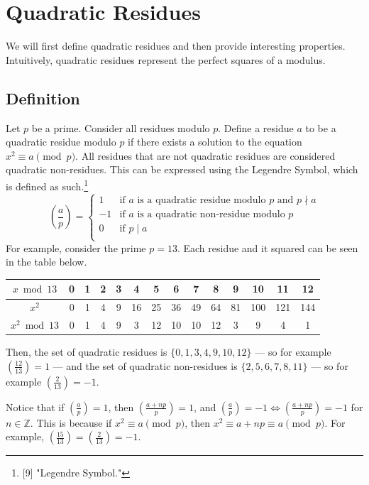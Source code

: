 \documentclass{article}
\newcommand{\Z}{\mathbb{Z}}
\newcommand{\qrn}[2]{\left( \frac{#1}{#2}\right)}
\begin{document}
\section{Quadratic Residues}
We will first define quadratic residues and then provide interesting properties. Intuitively, quadratic residues represent the perfect squares of a modulus.
\subsection{Definition}
Let $p$ be a prime. Consider all residues modulo $p$. Define a residue $a$ to be a quadratic residue modulo $p$ if there exists a solution to the equation $x^2 \equiv a \pmod p$. All residues that are not quadratic residues are considered quadratic non-residues. This can be expressed using the Legendre Symbol, which is defined as such.\footnote{[9] "Legendre Symbol."}
\[   \left( \frac{a}{p} \right) = \left\{
\begin{array}{ll}
      1 & \text{if }a \text{ is a quadratic residue modulo }p \text{ and } p \nmid a \\
      -1 & \text{if }a \text{ is a quadratic non-residue modulo }p\\
      0 & \text{if }p \mid a \\
\end{array} 
\right. \]
For example, consider the prime $p=13$. Each residue and it squared can be seen in the table below.
\begin{table}[H]
\centering
\begin{tabular}{|c|c|c|c|c|c|c|c|c|c|c|c|c|c|}
\hline
$x \bmod {13}$      & 0 & 1 & 2 & 3 & 4 & 5  & 6  & 7  & 8  & 9 & 10 & 11 & 12 \\ \hline
$x^2$ & 0 & 1 & 4 & 9 & 16 & 25 & 36 & 49 & 64 & 81 & 100  & 121  & 144  \\ \hline
$x^2\bmod {13}$ & 0 & 1 & 4 & 9 & 3 & 12 & 10 & 10 & 12 & 3 & 9  & 4  & 1  \\ \hline
\end{tabular}
\end{table}
Then, the set of quadratic residues is $\{0, 1, 3, 4, 9, 10, 12\}$ --- so for example $\qrn{12}{13}=1$ --- and the set of quadratic non-residues is $\{2, 5, 6, 7, 8, 11\}$ --- so for example $\qrn{2}{13}=-1$.

Notice that if $\qrn{a}{p} = 1$, then $\qrn{a+np}{p} = 1$, and $\qrn{a}{p} = -1 \iff \qrn{a+np}{p} = -1$ for $n \in \Z$. This is because if $x^2 \equiv a \pmod p$, then $x^2 \equiv a + np \equiv a \pmod p$. For example, $\qrn{15}{13} =\qrn{2}{13}=-1$.
\end{document}
